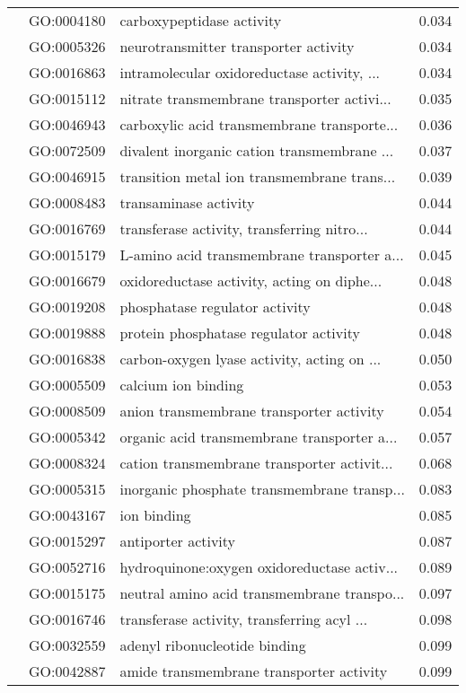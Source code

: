 \begin{longtable}{lllr}
   & GO:0004180 &                    carboxypeptidase activity &         0.034 \\
   & GO:0005326 &        neurotransmitter transporter activity &         0.034 \\
   & GO:0016863 &  intramolecular oxidoreductase activity, ... &         0.034 \\
   & GO:0015112 &  nitrate transmembrane transporter activi... &         0.035 \\
   & GO:0046943 &  carboxylic acid transmembrane transporte... &         0.036 \\
   & GO:0072509 &  divalent inorganic cation transmembrane ... &         0.037 \\
   & GO:0046915 &  transition metal ion transmembrane trans... &         0.039 \\
   & GO:0008483 &                        transaminase activity &         0.044 \\
   & GO:0016769 &  transferase activity, transferring nitro... &         0.044 \\
   & GO:0015179 &  L-amino acid transmembrane transporter a... &         0.045 \\
   & GO:0016679 &  oxidoreductase activity, acting on diphe... &         0.048 \\
   & GO:0019208 &               phosphatase regulator activity &         0.048 \\
   & GO:0019888 &       protein phosphatase regulator activity &         0.048 \\
   & GO:0016838 &  carbon-oxygen lyase activity, acting on ... &         0.050 \\
   & GO:0005509 &                          calcium ion binding &         0.053 \\
   & GO:0008509 &     anion transmembrane transporter activity &         0.054 \\
   & GO:0005342 &  organic acid transmembrane transporter a... &         0.057 \\
   & GO:0008324 &  cation transmembrane transporter activit... &         0.068 \\
   & GO:0005315 &  inorganic phosphate transmembrane transp... &         0.083 \\
   & GO:0043167 &                                  ion binding &         0.085 \\
   & GO:0015297 &                          antiporter activity &         0.087 \\
   & GO:0052716 &  hydroquinone:oxygen oxidoreductase activ... &         0.089 \\
   & GO:0015175 &  neutral amino acid transmembrane transpo... &         0.097 \\
   & GO:0016746 &  transferase activity, transferring acyl ... &         0.098 \\
   & GO:0032559 &                adenyl ribonucleotide binding &         0.099 \\
   & GO:0042887 &     amide transmembrane transporter activity &         0.099 \\
\end{longtable}
